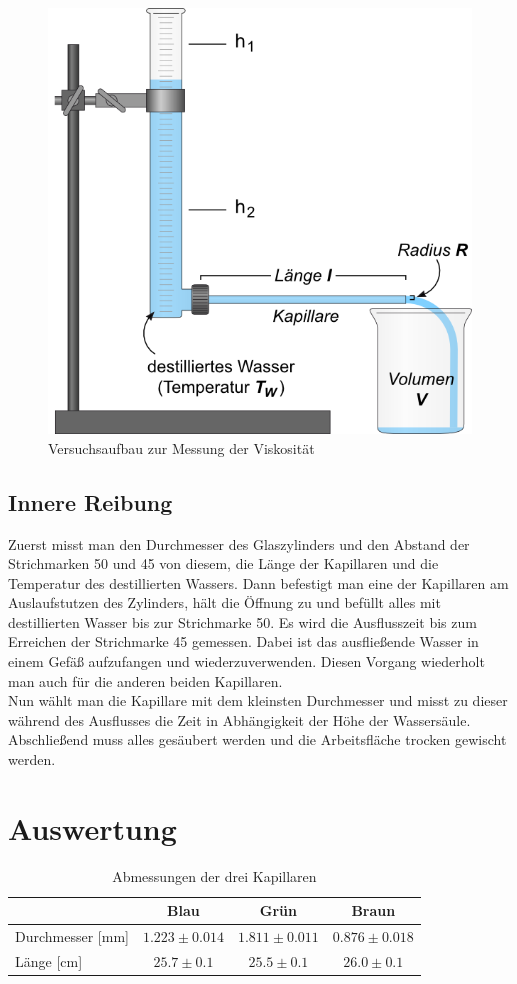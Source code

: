 \documentclass[12pt,a4paper,titlepage,headinclude,bibtotoc]{scrartcl}
\begin{document}
\begin{figure}[!htb]
	\centering
	\includegraphics[scale=0.6]{ViskoAufbau.png}
	\caption{Versuchsaufbau zur Messung der Viskosität \cite{lp}}
	\label{fig:Visko}
\end{figure}
\subsection{Innere Reibung}
Zuerst misst man den Durchmesser des Glaszylinders und den Abstand der Strichmarken 50 und 45 von diesem, die Länge der Kapillaren und die Temperatur des destillierten Wassers.
Dann befestigt man eine der Kapillaren am Auslaufstutzen des Zylinders, hält die Öffnung zu und befüllt alles mit destillierten Wasser bis zur Strichmarke 50.
Es wird die Ausflusszeit bis zum Erreichen der Strichmarke 45 gemessen.
Dabei ist das ausfließende Wasser in einem Gefäß aufzufangen und wiederzuverwenden.
Diesen Vorgang wiederholt man auch für die anderen beiden Kapillaren.\\
Nun wählt man die Kapillare mit dem kleinsten Durchmesser und misst zu dieser während des Ausflusses die Zeit in Abhängigkeit der Höhe der Wassersäule.\\
Abschließend muss alles gesäubert werden und die Arbeitsfläche trocken gewischt werden.

\section{Auswertung}
\label{sec:auswertung}
\begin{table}[!h]
\centering
\begin{tabular}{|l|c|c|c|}
\hline
 & Blau & Grün & Braun\\\hline
Durchmesser [mm]&$1.223\pm 0.014$&$1.811\pm 0.011$&$0.876\pm 0.018$\\\hline
Länge [cm]&$25.7\pm 0.1$&$ 25.5\pm 0.1$&$26.0\pm 0.1$\\\hline
\end{tabular}
\caption{Abmessungen der drei Kapillaren}
\end{table}
\end{document}
